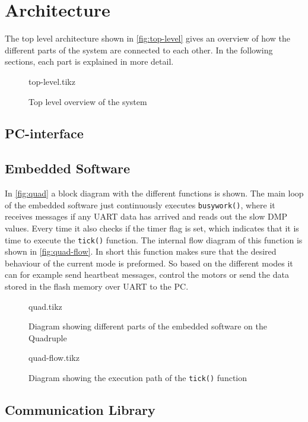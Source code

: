 \documentclass[final]{article}
\begin{document}
\section{Architecture}
The top level architecture shown in \autoref{fig:top-level} gives an overview of how the different parts of the system are connected to each other. In the following sections, each part is explained in more detail.

\begin{figure}[H]
\centering
    {top-level.tikz}
    \caption{Top level overview of the system}
    \label{fig:top-level}
\end{figure}

\subsection{PC-interface}

\subsection{Embedded Software}
In \autoref{fig:quad} a block diagram with the different functions is shown.
The main loop of the embedded software just continuously executes \texttt{busywork()}, where it receives messages if any UART data has arrived and reads out the slow DMP values.
Every time it also checks if the timer flag is set, which indicates that it is time to execute the \texttt{tick()} function.
The internal flow diagram of this function is shown in \autoref{fig:quad-flow}.
In short this function makes sure that the desired behaviour of the current mode is preformed.
So based on the different modes it can for example send heartbeat messages, control the motors or send the data stored in the flash memory over UART to the PC.

\begin{figure}[H]
\centering
    {quad.tikz}
    \caption{Diagram showing different parts of the embedded software on the Quadruple}
    \label{fig:quad}
\end{figure}

\begin{figure}[H]
\centering
    {quad-flow.tikz}
    \caption{Diagram showing the execution path of the \texttt{tick()} function}
    \label{fig:quad-flow}
\end{figure}


\subsection{Communication Library}
\end{document}
